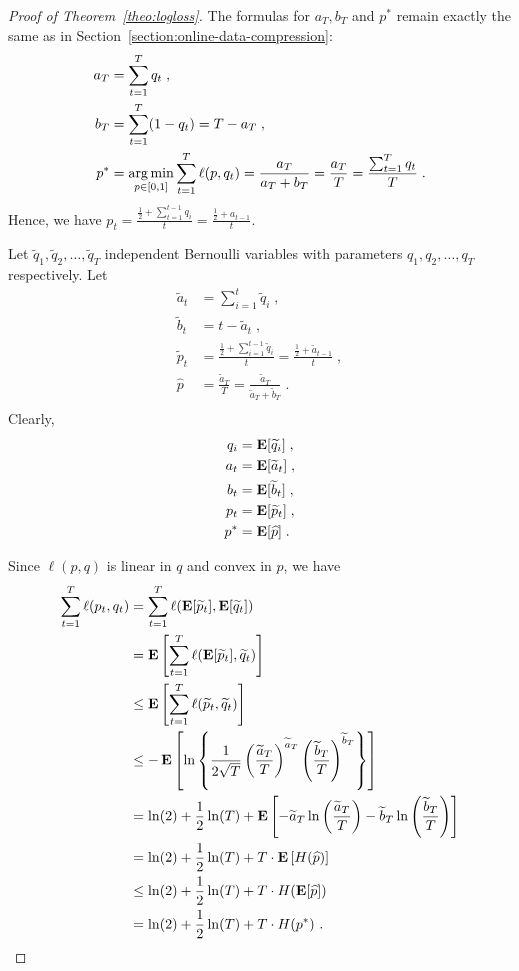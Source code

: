 \begin{proof}[Proof of Theorem~\ref{theo:logloss}]
The formulas for $a_T, b_T$ and $p^*$ remain exactly the same as in Section~\ref{section:online-data-compression}:
\begin{align*}
a_T & = \sum_{t=1}^T q_t \; , \\
b_T & = \sum_{t=1}^T (1 - q_t) = T - a_T \; , \\
p^* & =  \operatorname*{arg\,min}_{p \in [0,1]} \sum_{t=1}^T \ell(p, q_t) = \frac{a_T}{a_T + b_T} = \frac{a_T}{T} = \frac{\sum_{t=1}^T q_t}{T} \; .
\end{align*}
Hence, we have $p_t = \frac{\frac{1}{2} + \sum_{t=1}^{t-1} q_i}{t} = \frac{\frac{1}{2} + a_{t-1}}{t}$.

Let $\widetilde q_1, \widetilde q_2, \dots, \widetilde q_T$ independent
Bernoulli variables with parameters $q_1, q_2, \dots, q_T$ respectively.
Let
\begin{align*}
\widetilde a_t & = \sum_{i=1}^t \widetilde q_i  \; , \\
\widetilde b_t & = t - \widetilde a_t \; , \\
\widetilde p_t & = \frac{\frac{1}{2} + \sum_{i=1}^{t-1} \widetilde q_i}{t} = \frac{\frac{1}{2} + \widetilde a_{t-1}}{t} \; , \\
\widehat p & = \frac{\widetilde a_T}{T} = \frac{\widetilde a_T}{\widetilde a_T + \widetilde b_T} \; . \\
\end{align*}
Clearly,
\begin{align*}
q_i & = \operatorname*{\mathbf{E}}[\widetilde q_i] \; , \\
a_t & = \operatorname*{\mathbf{E}}[\widetilde a_t] \; , \\
b_t & = \operatorname*{\mathbf{E}}[\widetilde b_t] \; , \\
p_t & = \operatorname*{\mathbf{E}}[\widetilde p_t] \; , \\
p^* & = \operatorname*{\mathbf{E}}[\widehat p] \; .
\end{align*}

Since $\ell(p,q)$ is linear in $q$ and convex in $p$, we have
\begin{align*}
\sum_{t=1}^T \ell(p_t, q_t)
& = \sum_{t=1}^T \ell( \operatorname*{\mathbf{E}}[ \widetilde p_t], \operatorname*{\mathbf{E}}[\widetilde q_t]) \\
& = \operatorname*{\mathbf{E}}\left[ \sum_{t=1}^T \ell( \operatorname*{\mathbf{E}}[ \widetilde p_t], \widetilde q_t) \right] \\
& \le \operatorname*{\mathbf{E}}\left[ \sum_{t=1}^T \ell( \widetilde p_t, \widetilde q_t) \right] \\
& \le - \operatorname*{\mathbf{E}}\left[ \ln \left\{ \frac{1}{2\sqrt{T}} \left( \frac{\widetilde a_T}{T} \right)^{\widetilde a_T} \left( \frac{\widetilde b_T}{T} \right)^{\widetilde b_T} \right\} \right] \\
& = \ln(2) + \frac{1}{2} \ln(T) + \operatorname*{\mathbf{E}} \left[ - \widetilde a_T \ln \left( \frac{\widetilde a_T}{T} \right) - \widetilde b_T \ln \left( \frac{\widetilde b_T}{T} \right) \right] \\
& = \ln(2) + \frac{1}{2} \ln(T) + T \cdot \operatorname*{\mathbf{E}} \left[ H(\widehat p) \right] \\
& \le \ln(2) + \frac{1}{2} \ln(T) + T \cdot H(\operatorname*{\mathbf{E}}[\widehat p]) \\
& = \ln(2) + \frac{1}{2} \ln(T) + T \cdot H(p^*)~.
\end{align*}
\end{proof}